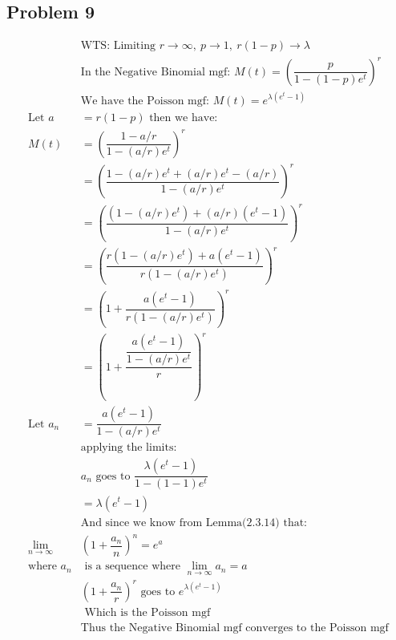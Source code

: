 \documentclass{article}
\begin{document}
\begin{flushleft}
\section*{Problem 9}
\begin{align*}
&\text{WTS: Limiting } r \to \infty, \ p \to 1, \ r(1-p) \to \lambda\\
&\text{In the Negative Binomial mgf: } M(t)=\left(\dfrac{p}{1-(1-p)e^t}\right)^r\\
&\text{We have the Poisson mgf: } M(t)=e^{\lambda(e^t-1)}\\
\text{Let } a&=r(1-p) \text{ then we have:}\\
M(t)&=\left(\dfrac{1-a/r}{1-(a/r)e^t}\right)^r\\
&=\left(\dfrac{1-(a/r)e^t+(a/r)e^t-(a/r)}{1-(a/r)e^t}\right)^r\\
&=\left(\dfrac{(1-(a/r)e^t)+(a/r)(e^t-1)}{1-(a/r)e^t}\right)^r\\
&=\left(\dfrac{r(1-(a/r)e^t)+a(e^t-1)}{r(1-(a/r)e^t)}\right)^r\\
&=\left(1+\dfrac{a(e^t-1)}{r(1-(a/r)e^t)}\right)^r\\
&=\left(1+\dfrac{\dfrac{a(e^t-1)}{{1-(a/r)e^t}}}{r}\right)^r\\
\text{Let } a_n&=\dfrac{a(e^t-1)}{{1-(a/r)e^t}}\\
&\text{applying the limits:}\\
&a_n \text{ goes to } \dfrac{\lambda(e^t-1)}{1-(1-1)e^t}\\ 
&=\lambda(e^t-1)\\
&\text{And since we know from Lemma(2.3.14) that:}\\
\lim \limits_{n\to \infty}& (1+\dfrac{a_n}{n})^n=e^a\\
\text{where } a_n& \text{ is a sequence where  } \lim \limits_{n\to \infty}a_n=a\\
&\left(1+\dfrac{a_n}{r}\right)^r \text{ goes to } 
e^{\lambda(e^t-1)}\\
&\text{ Which is the Poisson mgf}\\
&\text{Thus the Negative Binomial mgf converges to the Poisson mgf}
\end{align*}

\end{flushleft}
\end{document}
